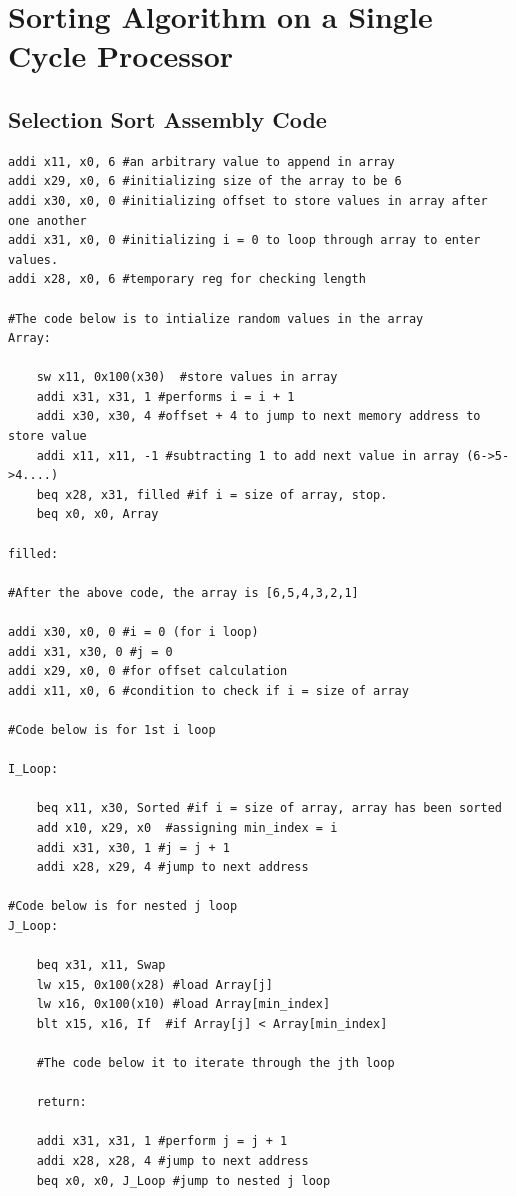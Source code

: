 \documentclass{article}
\begin{document}
\tableofcontents
\newpage

\section{Sorting Algorithm on a Single Cycle Processor}
\subsection{Selection Sort Assembly Code} 
\begin{lstlisting}[caption={Selection Sort Assembly code}, captionpos=b, language=RISC-V]
addi x11, x0, 6 #an arbitrary value to append in array
addi x29, x0, 6 #initializing size of the array to be 6
addi x30, x0, 0 #initializing offset to store values in array after one another
addi x31, x0, 0 #initializing i = 0 to loop through array to enter values.
addi x28, x0, 6 #temporary reg for checking length

#The code below is to intialize random values in the array
Array:

    sw x11, 0x100(x30)  #store values in array
    addi x31, x31, 1 #performs i = i + 1
    addi x30, x30, 4 #offset + 4 to jump to next memory address to store value
    addi x11, x11, -1 #subtracting 1 to add next value in array (6->5->4....)
    beq x28, x31, filled #if i = size of array, stop.
    beq x0, x0, Array
    
filled:

#After the above code, the array is [6,5,4,3,2,1]

addi x30, x0, 0 #i = 0 (for i loop)
addi x31, x30, 0 #j = 0
addi x29, x0, 0 #for offset calculation
addi x11, x0, 6 #condition to check if i = size of array 

#Code below is for 1st i loop

I_Loop:

    beq x11, x30, Sorted #if i = size of array, array has been sorted
    add x10, x29, x0  #assigning min_index = i
    addi x31, x30, 1 #j = j + 1
    addi x28, x29, 4 #jump to next address

#Code below is for nested j loop
J_Loop:

    beq x31, x11, Swap
    lw x15, 0x100(x28) #load Array[j]
    lw x16, 0x100(x10) #load Array[min_index]
    blt x15, x16, If  #if Array[j] < Array[min_index]
    
    #The code below it to iterate through the jth loop
    
    return: 
    
    addi x31, x31, 1 #perform j = j + 1
    addi x28, x28, 4 #jump to next address
    beq x0, x0, J_Loop #jump to nested j loop
    

\end{lstlisting}
\end{document}
